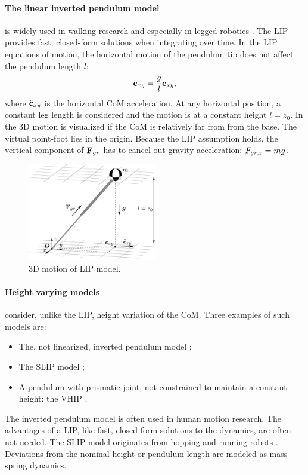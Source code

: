 \paragraph{The linear inverted pendulum model} is widely used in walking research and especially in legged robotics \cite{kajita20013d}. The \ac{LIP} provides fast, closed-form solutions when integrating over time. In the \ac{LIP} equations of motion, the horizontal motion of the pendulum tip does not affect the pendulum length $l$:
\begin{equation}
\ddot{\mathbf{c}}_{xy}=\frac{g}{l}\mathbf{c}_{xy},
\label{eq:LIPeom}
\end{equation}
where $\ddot{\mathbf{c}}_{xy}$ is the horizontal \ac{CoM} acceleration. At any horizontal position, a constant leg length is considered and the motion is at a constant height $l=z_0$. In  the \ac{3D} motion is visualized if the \ac{CoM} is relatively far from from the base. The virtual point-foot lies in the origin. Because the \ac{LIP} assumption holds, the vertical component of $\mathbf{F}_{gr}$ has to cancel out gravity acceleration: $F_{gr,z}=mg$.\\
\begin{figure}
\centering
\includegraphics[width=0.5\textwidth]{STYLESTUFF/3DCoMwithoutfoot.png}
\caption{\ac{3D} motion of \ac{LIP} model.}
\label{fig:3dlip}
\end{figure}

\paragraph{Height varying models} consider, unlike the \ac{LIP}, height variation of the \ac{CoM}. Three examples of such models are:
\begin{itemize}
	\item The, not linearized, inverted pendulum model \cite{kuo2005energetic};
	\item The \ac{SLIP} model \cite{liu2015trajectory};
	\item A pendulum with prismatic joint, not constrained to maintain a constant height: the \ac{VHIP} \cite{pratt2007derivation}.
\end{itemize}
The inverted pendulum model is often used in human motion research. The advantages of a \ac{LIP}, like fast, closed-form solutions to the dynamics, are often not needed. The \ac{SLIP} model originates from hopping and running robots \cite{schwind1998spring}. Deviations from the nominal height or pendulum length are modeled as mass-spring dynamics. 

